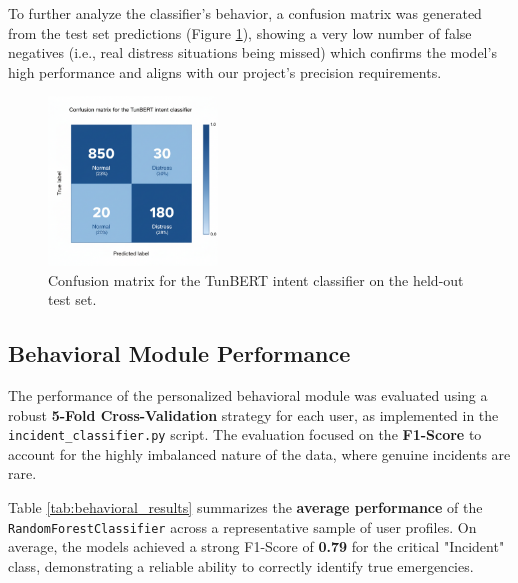 \documentclass[12pt,a4paper,oneside,english]{book}
\begin{document}
{To further analyze the classifier's behavior, a confusion matrix was generated from the test set predictions (Figure \ref{fig:nlp_confusion_matrix}),  showing a very low number of false 
negatives (i.e., real distress situations being missed) which confirms the model's high performance and aligns with our project's precision requirements.

\begin{figure}[h!]
    \centering
    \includegraphics[width=0.4\textwidth]{images/confusionmatrix_nlp.png}
    \caption{Confusion matrix for the TunBERT intent classifier on the held-out test set.}
    \label{fig:nlp_confusion_matrix}
\end{figure}

\subsection{Behavioral Module Performance}
\label{subsec:behavioral_results}

The performance of the personalized behavioral module was evaluated using a robust \textbf{5-Fold Cross-Validation} strategy for each user, as implemented in the \texttt{incident\_classifier.py} script. The evaluation focused on the \textbf{F1-Score} to account for the highly imbalanced nature of the data, where genuine incidents are rare.

Table \ref{tab:behavioral_results} summarizes the \textbf{average performance} of the \texttt{RandomForestClassifier} across a representative sample of user profiles. On average, the models achieved a strong F1-Score of \textbf{0.79} for the critical "Incident" class, demonstrating a reliable ability to correctly identify true emergencies.

}
\end{document}
